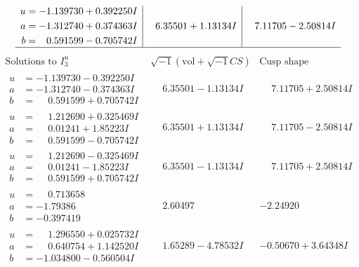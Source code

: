 \documentclass[1p]{elsarticle_modified}
\theoremstyle{definition}
\newcommand{\I}{\sqrt{-1}}
\begin{document}
$$\begin{array}{c|c|c}
\begin{aligned}
u &= -1.139730 + 0.392250 I \\
a &= -1.312740 + 0.374363 I \\
b &= \phantom{-}0.591599 - 0.705742 I\end{aligned}
 & \phantom{-}6.35501 + 1.13134 I & \phantom{-}7.11705 - 2.50814 I\\
 \hline 
 \end{array}$$\newpage$$\begin{array}{c|c|c}  
\text{Solutions to }I^u_{3}& \I (\text{vol} + \sqrt{-1}CS) & \text{Cusp shape}\\
 \hline 
\begin{aligned}
u &= -1.139730 - 0.392250 I \\
a &= -1.312740 - 0.374363 I \\
b &= \phantom{-}0.591599 + 0.705742 I\end{aligned}
 & \phantom{-}6.35501 - 1.13134 I & \phantom{-}7.11705 + 2.50814 I \\ \hline\begin{aligned}
u &= \phantom{-}1.212690 + 0.325469 I \\
a &= \phantom{-}0.01241 + 1.85223 I \\
b &= \phantom{-}0.591599 - 0.705742 I\end{aligned}
 & \phantom{-}6.35501 + 1.13134 I & \phantom{-}7.11705 - 2.50814 I \\ \hline\begin{aligned}
u &= \phantom{-}1.212690 - 0.325469 I \\
a &= \phantom{-}0.01241 - 1.85223 I \\
b &= \phantom{-}0.591599 + 0.705742 I\end{aligned}
 & \phantom{-}6.35501 - 1.13134 I & \phantom{-}7.11705 + 2.50814 I \\ \hline\begin{aligned}
u &= \phantom{-}0.713658\phantom{ +0.000000I} \\
a &= -1.79386\phantom{ +0.000000I} \\
b &= -0.397419\phantom{ +0.000000I}\end{aligned}
 & \phantom{-}2.60497\phantom{ +0.000000I} & -2.24920\phantom{ +0.000000I} \\ \hline\begin{aligned}
u &= \phantom{-}1.296550 + 0.025732 I \\
a &= \phantom{-}0.640754 + 1.142520 I \\
b &= -1.034800 - 0.560504 I\end{aligned}
 & \phantom{-}1.65289 - 4.78532 I & -0.50670 + 3.64348 I \\ \hline\begin{aligned}

\end{aligned}
\end{array}$$
\end{document}
